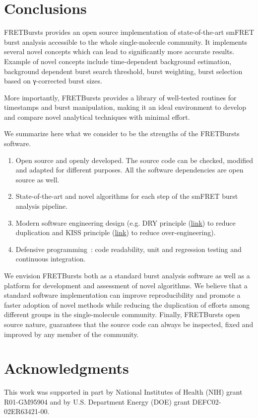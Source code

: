 \section{Conclusions}
\label{sec:conclusions}

FRETBursts provides an open source implementation of state-of-the-art smFRET burst analysis
accessible to the whole single-molecule community.
It implements several novel concepts which can lead
to significantly more accurate results. Example of novel concepts include
time-dependent background estimation, background dependent burst search threshold,
burst weighting, burst selection based on γ-corrected burst sizes.

More importantly, FRETBursts provides a library of well-tested routines
for timestamps and burst manipulation, making it an ideal environment to
develop and compare novel analytical techniques with minimal effort.

We summarize here what we consider to be the strengths
of the FRETBursts software.

\begin{enumerate}
\item Open source and openly developed. The source code can be checked, modified and
adapted for different purposes. All the software dependencies are open source as well.
\item State-of-the-art and novel algorithms for each step of the
smFRET burst analysis pipeline.
\item Modern software engineering design (e.g. DRY principle
(\href{http://en.wikipedia.org/wiki/Don\%27t_repeat_yourself}{link})
to reduce duplication and KISS principle
(\href{http://en.wikipedia.org/wiki/KISS_principle}{link})
to reduce over-engineering).
\item Defensive programming~\cite{Prli__2012}: code readability,
unit and regression testing and continuous integration.
\end{enumerate}

We envision FRETBursts both as a standard burst analysis
software as well as a platform for development and assessment of novel algorithms.
We believe that a standard software implementation can improve
reproducibility and promote a faster adoption of novel methods 
while reducing the duplication of efforts among different groups
in the single-molecule community.
Finally, FRETBursts open source nature, guarantees that the source code
can always be inspected, fixed and improved
by any member of the community.


\section*{Acknowledgments}
This work was supported in part by National Institutes of Health (NIH)
grant R01-GM95904 and by U.S. Department Energy (DOE) grant DEFC02-02ER63421-00.
